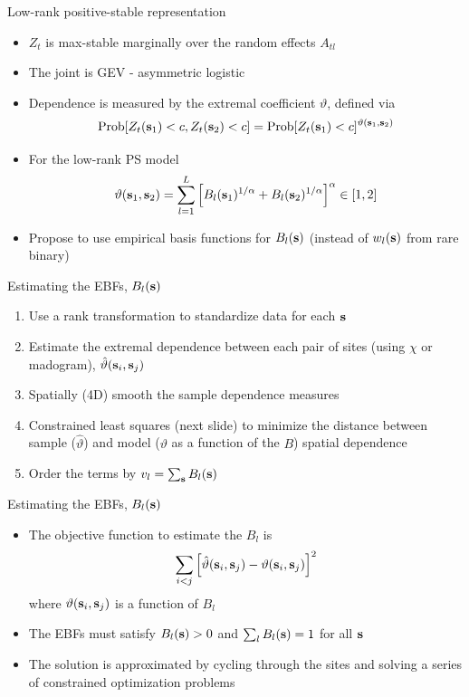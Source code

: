 \documentclass{beamer}
\begin{document}
\begin{frame}{Low-rank positive-stable representation}
	\begin{itemize}\setlength{\itemsep}{1em}
		\item $Z_t$ is max-stable marginally over the random effects $A_{tl}$
		\item The joint is GEV - asymmetric logistic
		\item Dependence is measured by the extremal coefficient $\vartheta$, defined via $$\mbox{Prob}[Z_t(\mathbf{s}_1)<c, Z_t(\mathbf{s}_2)<c] = \mbox{Prob}[Z_t(\mathbf{s}_1)<c]^{\vartheta(\mathbf{s}_1,\mathbf{s}_2)}$$
		\item For the low-rank PS model $$\vartheta(\mathbf{s}_1,\mathbf{s}_2) = \sum_{l=1}^L\left[B_l(\mathbf{s}_1)^{1/\alpha}+B_l(\mathbf{s}_2)^{1/\alpha}\right]^{\alpha}\in[1,2] $$
		\item Propose to use empirical basis functions for $B_l(\mathbf{s})$ (instead of $w_l(\mathbf{s})$ from rare binary)
	\end{itemize}
\end{frame}


\begin{frame}{Estimating the EBFs, $B_l(\mathbf{s})$}
	\begin{enumerate}[1.]\setlength\itemsep{1em}
		\item Use a rank transformation to standardize data for each $\mathbf{s}$
		\item Estimate the extremal dependence between each pair of sites (using $\chi$ or madogram), ${\hat \vartheta}(\mathbf{s}_i,\mathbf{s}_j)$
		\item Spatially (4D) smooth the sample dependence measures
		\item Constrained least squares (next slide) to minimize the distance between sample (${\hat \vartheta}$) and model ($\vartheta$ as a function of the $B$) spatial dependence
		\item Order the terms by $v_l = \sum_{\mathbf{s}}B_l(\mathbf{s})$
	\end{enumerate}
\end{frame}


\begin{frame}{Estimating the EBFs, $B_l(\mathbf{s})$}
	\begin{itemize}\setlength\itemsep{1em}
		\item The objective function to estimate the $B_l$ is 
		$$ \sum_{i<j}\left[\hat{\vartheta}(\mathbf{s}_i,\mathbf{s}_j) - \vartheta(\mathbf{s}_i,\mathbf{s}_j)\right]^2$$
		where $\vartheta(\mathbf{s}_i,\mathbf{s}_j)$ is a function of $B_l$
		\item The EBFs must satisfy $B_l(\mathbf{s})>0$ and $\sum_{l}B_l(\mathbf{s})=1$ for all $\mathbf{s}$
		\item The solution is approximated by cycling through the sites and solving a series of constrained optimization problems
	\end{itemize}
\end{frame}
\end{document}
